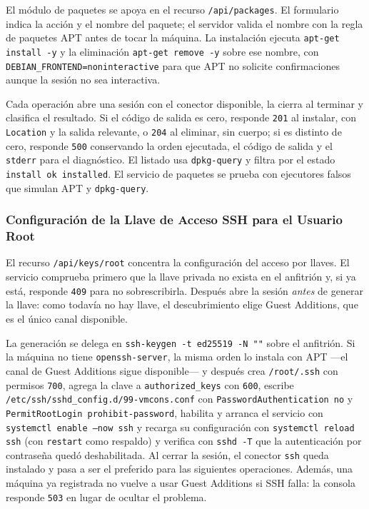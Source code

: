 El módulo de paquetes se apoya en el recurso \texttt{/api/packages}. El
formulario indica la acción y el nombre del paquete; el servidor valida
el nombre con la regla de paquetes APT antes de tocar la máquina. La
instalación ejecuta \texttt{apt-get install -y} y la eliminación
\texttt{apt-get remove -y} sobre ese nombre, con
\texttt{DEBIAN\_FRONTEND=noninteractive} para que APT no solicite
confirmaciones aunque la sesión no sea interactiva.

Cada operación abre una sesión con el conector disponible, la cierra al
terminar y clasifica el resultado. Si el código de salida es cero,
responde \texttt{201} al instalar, con \texttt{Location} y la salida
relevante, o \texttt{204} al eliminar, sin cuerpo; si es distinto
de cero, responde \texttt{500} conservando la orden ejecutada, el
código de salida y el \texttt{stderr} para el diagnóstico. El listado
usa \texttt{dpkg-query} y filtra por el estado
\texttt{install ok installed}. El servicio de paquetes se prueba con
ejecutores falsos que simulan APT y \texttt{dpkg-query}.

\subsubsection{Configuración de la Llave de Acceso SSH para el Usuario Root}
\label{sec:ssh-root}

El recurso \texttt{/api/keys/root} concentra la configuración del
acceso por llaves. El servicio comprueba primero que la llave privada no
exista en el anfitrión y, si ya está, responde \texttt{409} para no
sobrescribirla. Después abre la sesión \emph{antes} de generar la llave:
como todavía no hay llave, el descubrimiento elige Guest Additions, que
es el único canal disponible.

La generación se delega en \texttt{ssh-keygen -t ed25519 -N ""} sobre el
anfitrión. Si la máquina no tiene \texttt{openssh-server}, la misma orden
lo instala con APT ---el canal de Guest Additions sigue disponible--- y
después crea \texttt{/root/.ssh} con permisos \texttt{700}, agrega la
clave a \texttt{authorized\_keys} con \texttt{600}, escribe
\texttt{/etc/ssh/sshd\_config.d/99-vmcons.conf} con
\texttt{PasswordAuthentication no} y
\texttt{PermitRootLogin prohibit-password}, habilita y arranca el
servicio con \texttt{systemctl enable --now ssh} y recarga su
configuración con \texttt{systemctl reload ssh} (con \texttt{restart} como
respaldo) y verifica con \texttt{sshd -T} que la autenticación por
contraseña quedó deshabilitada. Al cerrar la sesión, el conector
\texttt{ssh} queda instalado y pasa a ser el preferido para las
siguientes operaciones. Además, una máquina ya registrada no vuelve a
usar Guest Additions si SSH falla: la consola responde \texttt{503} en
lugar de ocultar el problema.

